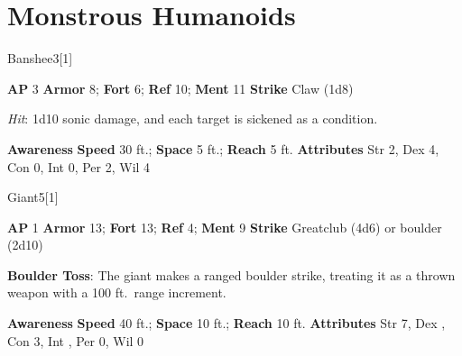 \section{Monstrous Humanoids}
\begin{monsection}{Banshee}{3}[1]
\vspace{-1em}\vspace{-1em}
\begin{spellcontent}
\begin{spelltargetinginfo}
{\textbf{AP} 3}
\pari \textbf{Armor} 8;
\textbf{Fort} 6;
\textbf{Ref} 10;
\textbf{Ment} 11
\pari \textbf{Strike} Claw  (1d8)
\end{spelltargetinginfo}
\begin{spelleffects}
\pari
{}
\par
\par \textit{Hit}: 1d10 sonic damage, and each target is sickened as a condition.
\end{spelleffects}
\end{spellcontent}
\begin{spellsubcontent}
\begin{spellfooter}
\pari \textbf{Awareness} 
\pari \textbf{Speed} 30 ft.;
\textbf{Space} 5 ft.;
\textbf{Reach} 5 ft.
\pari \textbf{Attributes}
Str 2,
Dex 4,
Con 0,
Int 0,
Per 2,
Wil 4
\end{spellfooter}
\end{spellsubcontent}
\end{monsection}
\begin{monsection}[Hill]{Giant}{5}[1]
\vspace{-1em}\vspace{-1em}
\begin{spellcontent}
\begin{spelltargetinginfo}
{\textbf{AP} 1}
\pari \textbf{Armor} 13;
\textbf{Fort} 13;
\textbf{Ref} 4;
\textbf{Ment} 9
\pari \textbf{Strike} Greatclub  (4d6) or boulder  (2d10)
\end{spelltargetinginfo}
\begin{spelleffects}
\pari
\textbf{Boulder Toss}:
The giant makes a ranged boulder strike, treating it as a thrown weapon with a 100 ft.\ range increment.
\end{spelleffects}
\end{spellcontent}
\begin{spellsubcontent}
\begin{spellfooter}
\pari \textbf{Awareness} 
\pari \textbf{Speed} 40 ft.;
\textbf{Space} 10 ft.;
\textbf{Reach} 10 ft.
\pari \textbf{Attributes}
Str 7,
Dex ,
Con 3,
Int ,
Per 0,
Wil 0
\end{spellfooter}
\end{spellsubcontent}
\end{monsection}
